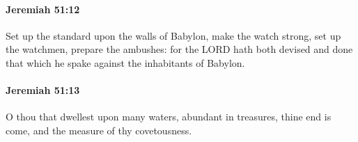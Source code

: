 		\paragraph{Jeremiah 51:12} %
			\label{JEREMIAH-51-12}

			Set up the standard upon the walls of Babylon, make the watch strong, set up the watchmen, prepare the ambushes: for the LORD hath both devised and done that which he spake against the inhabitants of Babylon.


		\paragraph{Jeremiah 51:13} %
			\label{JEREMIAH-51-13}

			O thou that dwellest upon many waters, abundant in treasures, thine end is come, and the measure of thy covetousness.


